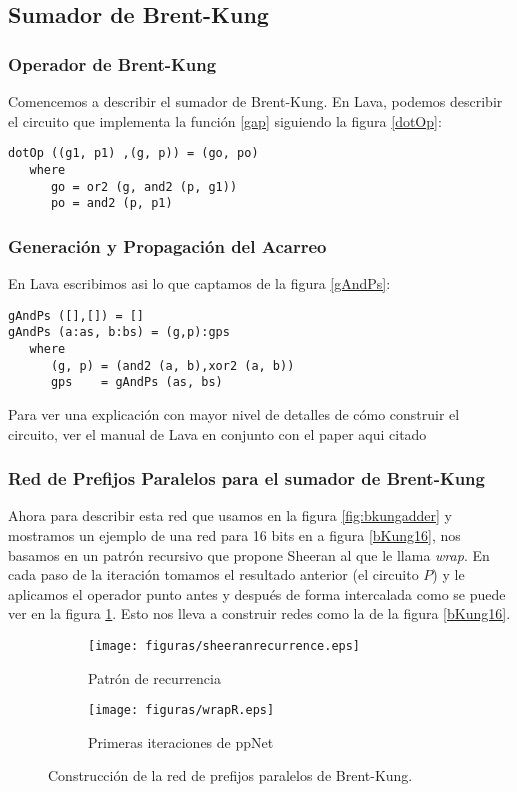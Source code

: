 \subsection{Sumador de Brent-Kung}
\subsubsection {Operador de Brent-Kung}
\noindent Comencemos a describir el sumador de Brent-Kung.
En Lava, podemos describir el circuito que implementa la función \ref{gap} siguiendo la figura \ref{dotOp}:

\begin{lstlisting}
dotOp ((g1, p1) ,(g, p)) = (go, po)
   where
      go = or2 (g, and2 (p, g1))
      po = and2 (p, p1)
\end{lstlisting}

\subsubsection {Generación y Propagación del Acarreo}
\noindent En Lava escribimos asi lo que captamos de la figura \ref{gAndPs}:
\lstset{language=Haskell}
{
\begin{lstlisting}
gAndPs ([],[]) = []
gAndPs (a:as, b:bs) = (g,p):gps
   where
      (g, p) = (and2 (a, b),xor2 (a, b))
      gps    = gAndPs (as, bs)
\end{lstlisting}
}


Para ver una explicación con mayor nivel de detalles de cómo construir el circuito, ver el manual de Lava \cite{Lava-tutorial} en conjunto con el paper aqui citado \cite{4638988}


\subsubsection {Red de Prefijos Paralelos para el sumador de Brent-Kung}
\noindent Ahora para describir esta red que usamos en la figura \ref{fig:bkungadder} y mostramos un ejemplo de una red para 16 bits en a figura \ref{bKung16}, nos basamos en un patrón recursivo que propone Sheeran \cite{Shee07} al que le llama \emph{wrap}. En cada paso de la iteración tomamos el resultado anterior (el circuito \(P\)) y le aplicamos el operador punto antes y después de forma intercalada como se puede ver en la figura \ref{sheeranrecurrence}. Esto nos lleva a construir redes como la de la figura \ref{bKung16}.


\begin{figure}[h!]
\centering
 \begin{subfigure}{0.4\textwidth}
    \centering
    \texttt{[image: figuras/sheeranrecurrence.eps]}
    \caption{Patrón de recurrencia}
    \label{sheeranrecurrence}
 \end{subfigure}
 \begin{subfigure}{0.5\textwidth}
    \centering
    \texttt{[image: figuras/wrapR.eps]}
    \caption{Primeras iteraciones de ppNet}
    \label{firstsiter}
 \end{subfigure}
 \caption{Construcción de la red de prefijos paralelos de Brent-Kung.}
\end{figure}


